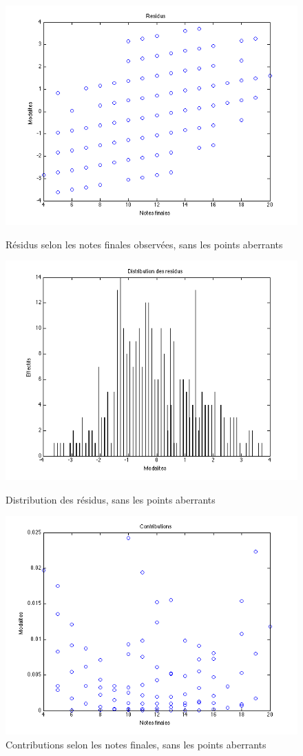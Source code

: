 \documentclass[11pt]{article}
\begin{document}
\begin{figure}[h]
\centering
\includegraphics[scale=0.5]{Images/fig10.png}
\caption{Résidus selon les notes finales observées, sans les points aberrants}
\includegraphics[scale=0.5]{Images/fig11.png}
\caption{Distribution des résidus, sans les points aberrants}
\includegraphics[scale=0.45]{Images/fig12.png}
\caption{Contributions selon les notes finales, sans les points aberrants}
\end{figure}
\end{document}
